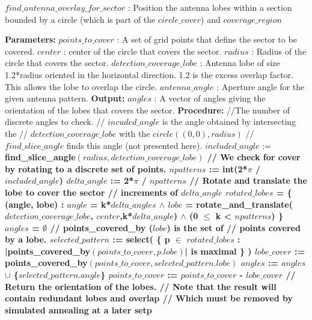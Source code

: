 \begin{algorithm}[!htb]
\caption{\textbf{$find\_antenna\_overlay\_for\_sector$} : Position the antenna lobes within a section bounded by a circle (which is part of the $circle\_cover$) and $coverage\_region$ }
\begin{algorithmic}
\State \textbf{Parameters:}
\State \tab $points\_to\_cover$ : A set of grid points that define the 
\State \tab \tab sector to be covered.
\State \tab $center$ : center of the circle that covers the sector.
\State \tab $radius$ : Radius of the circle that covers the sector.
\State \tab $detection\_coverage\_lobe$ : Antenna lobe of size 1.2*radius oriented 
\State \tab \tab in the horizontal direction. 1.2 is the excess overlap factor.
\State \tab \tab This allows the lobe to overlap the circle.  
\State \tab $antenna\_angle$ : Aperture angle for the given antenna pattern.
\State \textbf{Output:}
\State \tab  $angles$ : A vector of angles giving the orientation of the 
\State \tab \tab lobes that covers the sector.
\State \textbf{Procedure:}
\State
\State //The number of discrete angles to check.
\State // $incuded\_angle$ is the angle obtained by intersecting the 
\State // $detection\_coverage\_lobe$ with the $circle((0,0),radius)$
\State // $find\_slice\_angle$ finds this angle (not presented here).
\State $included\_angle$ := \bf{find\_slice\_angle}$(radius,detection\_coverage\_lobe)$
\State // We check for cover by rotating to a discrete set of points.
\State $npatterns$ := \bf{int}(2*$\pi$ / $included\_angle$)
\State $delta\_angle$ := 2*$\pi$ / $npatterns$
\State // Rotate and translate the lobe to cover the sector 
\State // increments of $delta\_angle$
\State $rotated\_lobes$ = \{ (angle, lobe) :
\State \tab \tab \tab  $angle$ = k*$delta\_angles$ 
\State \tab \tab \tab  $\wedge$ $lobe$ = \bf{rotate\_and\_translate}($detection\_coverage\_lobe$,
\State \tab \tab \tab \tab \tab $center$,k*$delta\_angle$) 
\State \tab \tab  \tab $\wedge$ (0 $\le$ k < $npatterns$) \}
\State
\State $angles$ = $\emptyset$
\State // \bf{points\_covered\_by} ($lobe$) is the set of 
\State // points covered by a lobe.
\State $selected\_pattern$ := \bf{select}( \{ p $\in$ $rotated\_lobes$ : 
\State \tab \tab \tab |\bf{points\_covered\_by}$(points\_to\_cover,p.lobe)$| 
\State \tab \tab \tab \tab is maximal \} )
\State $lobe\_cover$ := \bf{points\_covered\_by}$(points\_to\_cover,selected\_pattern.lobe)$
\State $angles$ := $angles$  $\cup$ \{$selected\_pattern.angle$\}
\State $points\_to\_cover$ := $points\_to\_cover$ - $lobe\_cover$
\EndWhile
\State // Return the orientation of the lobes.
\State // Note that the result will contain redundant lobes and overlap 
\State // Which must be removed by simulated annealing at a later setp
\State {}
\end{algorithmic}
\end{algorithm}

